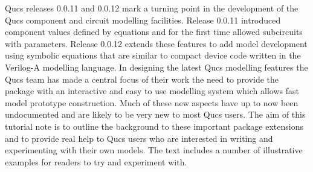 %
%
%
%

\renewcommand{\thesubfigure}{\thefigure(\alph{subfigure})}
\makeatletter
  \renewcommand{\@thesubfigure}{\thesubfigure:\space}
  \renewcommand{\p@subfigure}{}
\makeatother

\renewcommand{\thesubtable}{\thetable(\alph{subtable})}
\makeatletter
  \renewcommand{\@thesubtable}{\thesubtable:\space}
  \renewcommand{\p@subtable}{}
\makeatother


Qucs releases 0.0.11 and 0.0.12 mark a turning point in the
development of the Qucs component and circuit modelling facilities.
Release 0.0.11 introduced component values defined by equations and
for the first time allowed subcircuits with parameters.  Release
0.0.12 extends these features to add model development using symbolic
equations that are similar to compact device code written in the
Verilog-A modelling language. In designing the latest Qucs modelling
features the Qucs team has made a central focus of their work the need
to provide the package with an interactive and easy to use modelling
system which allows fast model prototype construction.  Much of these
new aspects have up to now been undocumented and are likely to be very
new to most Qucs users.  The aim of this tutorial note is to outline
the background to these important package extensions and to provide
real help to Qucs users who are interested in writing and
experimenting with their own models. The text includes a number of
illustrative examples for readers to try and experiment with.


